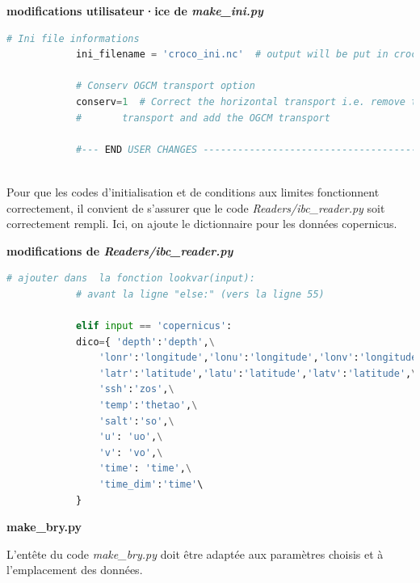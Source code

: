 \documentclass[10pt,a4paper,titlepage]{article}
\begin{document}
\begin{codeEnv}{\textbf{modifications utilisateur·ice de \textit{make\_ini.py}}}
\begin{lstlisting}[language=python]
            # Ini file informations
            ini_filename = 'croco_ini.nc'  # output will be put in croco_dir by default
            
            # Conserv OGCM transport option
            conserv=1  # Correct the horizontal transport i.e. remove the integrated
            #       transport and add the OGCM transport
            
            #--- END USER CHANGES -----------------------------------------------------
            
        \end{lstlisting}
    \end{codeEnv}
    
    Pour que les codes d'initialisation et de conditions aux limites fonctionnent correctement, il convient de s'assurer que le code \textit{Readers/ibc\_reader.py} soit correctement rempli.  Ici, on ajoute le dictionnaire pour les données copernicus.
    
    \begin{codeEnv}{\textbf{modifications de \textit{Readers/ibc\_reader.py}}}
        \begin{lstlisting}[language=python]
            # ajouter dans  la fonction lookvar(input):
            # avant la ligne "else:" (vers la ligne 55)
            
            elif input == 'copernicus':
            dico={ 'depth':'depth',\
                'lonr':'longitude','lonu':'longitude','lonv':'longitude',\
                'latr':'latitude','latu':'latitude','latv':'latitude',\
                'ssh':'zos',\
                'temp':'thetao',\
                'salt':'so',\
                'u': 'uo',\
                'v': 'vo',\
                'time': 'time',\
                'time_dim':'time'\
            }
        \end{lstlisting}
    \end{codeEnv}
    
    \textbf{make\_bry.py}
    
    L'entête du code \textit{make\_bry.py} doit être adaptée aux paramètres choisis et à l'emplacement des données.
    
\end{document}
